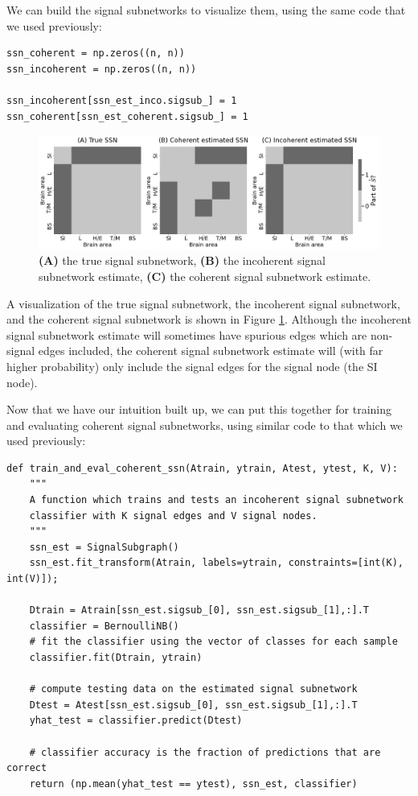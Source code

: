 We can build the signal subnetworks to visualize them, using the same code that we used previously:

\begin{lstlisting}[style=python]
ssn_coherent = np.zeros((n, n))
ssn_incoherent = np.zeros((n, n))

ssn_incoherent[ssn_est_inco.sigsub_] = 1
ssn_coherent[ssn_est_coherent.sigsub_] = 1
\end{lstlisting}

\begin{figure}
    \centering
    \includegraphics{applications/ch9/Images/ssn_co.png}
    \caption[Comparing coherent and incoherent signal subnetwork estimates.]{\textbf{(A)} the true signal subnetwork, \textbf{(B)} the incoherent signal subnetwork estimate, \textbf{(C)} the coherent signal subnetwork estimate.}
    \label{fig:ch9:ssn:ssn_coh}
\end{figure}
A visualization of the true signal subnetwork, the incoherent signal subnetwork, and the coherent signal subnetwork is shown in Figure \ref{fig:ch9:ssn:ssn_coh}. Although the incoherent signal subnetwork estimate will sometimes have spurious edges which are non-signal edges included, the coherent signal subnetwork estimate will (with far higher probability) only include the signal edges for the signal node (the SI node). 

Now that we have our intuition built up, we can put this together for training and evaluating coherent signal subnetworks, using similar code to that which we used previously:

\begin{lstlisting}[style=python]
def train_and_eval_coherent_ssn(Atrain, ytrain, Atest, ytest, K, V):
    """
    A function which trains and tests an incoherent signal subnetwork
    classifier with K signal edges and V signal nodes.
    """
    ssn_est = SignalSubgraph()
    ssn_est.fit_transform(Atrain, labels=ytrain, constraints=[int(K), int(V)]);

    Dtrain = Atrain[ssn_est.sigsub_[0], ssn_est.sigsub_[1],:].T
    classifier = BernoulliNB()
    # fit the classifier using the vector of classes for each sample
    classifier.fit(Dtrain, ytrain)

    # compute testing data on the estimated signal subnetwork
    Dtest = Atest[ssn_est.sigsub_[0], ssn_est.sigsub_[1],:].T
    yhat_test = classifier.predict(Dtest)
    
    # classifier accuracy is the fraction of predictions that are correct
    return (np.mean(yhat_test == ytest), ssn_est, classifier)
\end{lstlisting}

